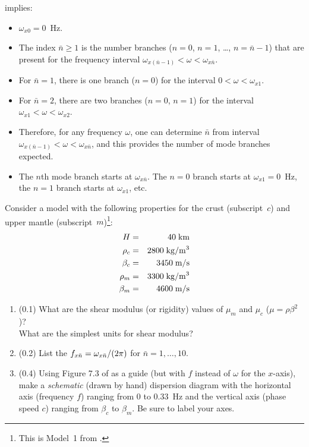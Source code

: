 \documentclass[11pt,titlepage,fleqn]{article}
\begin{document}
\begin{enumerate}
\pagebreak
{} implies:
%
\begin{itemize}
\item $\omega_{x0} = 0$~Hz.
\item The index $\bar{n} \ge 1$ is the number branches ($n = 0$, $n = 1$, \ldots, $n = \bar{n}-1$) that are present for the frequency interval
$\omega_{x{(\bar{n}-1)}} < \omega < \omega_{x\bar{n}}$.
\item For $\bar{n} = 1$, there is one branch ($n=0$) for the interval $0 < \omega < \omega_{x1}$.
\item For $\bar{n} = 2$, there are two branches ($n=0$, $n=1$) for the interval $\omega_{x1} < \omega < \omega_{x2}$.
\item Therefore, for any frequency $\omega$, one can determine $\bar{n}$ from interval $\omega_{x{(\bar{n}-1)}} < \omega < \omega_{x\bar{n}}$, and this provides the number of mode branches expected.
\item The $n$th mode branch starts at $\omega_{x\bar{n}}$. The $n=0$ branch starts at $\omega_{x1} = 0$~Hz, the $n=1$ branch starts at $\omega_{x1}$, etc.
\end{itemize}
%

Consider a model with the following properties for the crust (subscript~$c$) and upper mantle (subscript~$m$)\footnote{This is Model~1 from .}:
%
\begin{eqnarray*}
H &=& 40\;{\rm km}
\\
\rho_c &=& 2800 \;{\rm kg/m^3}
\\
\beta_c &=& 3450 \;{\rm m/s}
\\
\rho_m &=& 3300 \;{\rm kg/m^3}
\\
\beta_m &=& 4600 \;{\rm m/s}
\end{eqnarray*}

\begin{enumerate}
\item (0.1) What are the shear modulus (or rigidity) values of $\mu_m$ and $\mu_c$ ($\mu = \rho\beta^2$)? \\
What are the simplest units for shear modulus?

\item (0.2) List the ${f}_{x\bar{n}} = {\omega}_{x\bar{n}}/(2\pi)$ for $\bar{n}=1,\ldots,10$.

\item (0.4) Using Figure 7.3 of \citet{AkiRichardsE2} as a guide (but with $f$ instead of $\omega$ for the $x$-axis), make a {\em schematic} (\ie drawn by hand) dispersion diagram with the horizontal axis (frequency $f$) ranging from 0 to 0.33~Hz and the vertical axis (phase speed $c$) ranging from $\beta_c$ to $\beta_m$. Be sure to label your axes.


\end{enumerate}
\end{enumerate}
\end{document}
